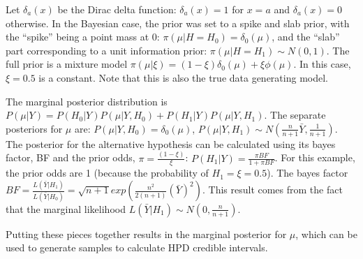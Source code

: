 \documentclass[12pt,twoside]{dukestatscithesis}
\theoremstyle{definition}
\theoremstyle{definition}
\theoremstyle{definition}
\theoremstyle{remark}
\begin{document}
Let \(\delta_a(x)\) be the Dirac delta function: \(\delta_a(x) = 1\) for
\(x = a\) and \(\delta_a(x)=0\) otherwise. In the Bayesian case, the
prior was set to a spike and slab prior, with the ``spike'' being a
point mass at 0: \(\pi(\mu|H=H_0) = \delta_0(\mu)\), and the ``slab''
part corresponding to a unit information prior:
\(\pi(\mu|H=H_1) \sim N(0, 1)\). The full prior is a mixture model
\(\pi(\mu|\xi) = (1-\xi ) \delta_0(\mu)+ \xi\phi(\mu)\). In this case,
\(\xi = 0.5\) is a constant. Note that this is also the true data
generating model.

The marginal posterior distribution is
\(P(\mu | Y ) = P(H_0|Y)P(\mu|Y, H_0) + P(H_1|Y)P(\mu|Y, H_1)\). The
separate posteriors for \(\mu\) are: \(P(\mu|Y, H_0) = \delta_0(\mu)\),
\(P(\mu|Y, H_1) \sim N(\frac{n}{n+1}\bar Y, \frac{1}{n+1})\). The
posterior for the alternative hypothesis can be calculated using its
bayes factor, BF and the prior odds, \(\pi = \frac{(1-\xi)}{\xi}\):
\(P(H_1| Y ) = \frac{\pi BF}{1+\pi BF}\). For this example, the prior
odds are 1 (because the probability of \(H_1 = \xi = 0.5\)). The bayes
factor
\(BF = \frac{L(\bar Y | H_1)}{L(\bar Y | H_0)} = \sqrt{n+1} exp(\frac{n^2}{2(n+1)}(\bar Y)^2)\).
This result comes from the fact that the marginal likelihood
\(L(\bar Y | H_1) \sim N(0, \frac{n}{n+1})\).

Putting these pieces together results in the marginal posterior for
\(\mu\), which can be used to generate samples to calculate HPD credible
intervals.
\end{document}
